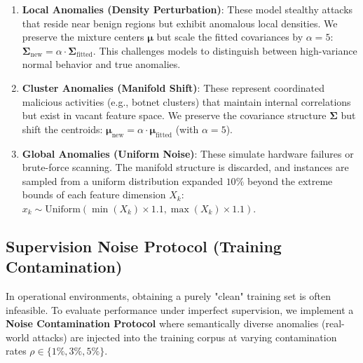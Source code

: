 \documentclass[final,twocolumn,10pt]{elsarticle}
\begin{document}
\begin{enumerate}
    \item \textbf{Local Anomalies (Density Perturbation)}: These model stealthy attacks that reside near benign regions but exhibit anomalous local densities. We preserve the mixture centers $\boldsymbol{\mu}$ but scale the fitted covariances by $\alpha = 5$: $\boldsymbol{\Sigma}_{\text{new}} = \alpha \cdot \boldsymbol{\Sigma}_{\text{fitted}}$. This challenges models to distinguish between high-variance normal behavior and true anomalies.
    
    \item \textbf{Cluster Anomalies (Manifold Shift)}: These represent coordinated malicious activities (e.g., botnet clusters) that maintain internal correlations but exist in vacant feature space. We preserve the covariance structure $\boldsymbol{\Sigma}$ but shift the centroids: $\boldsymbol{\mu}_{\text{new}} = \alpha \cdot \boldsymbol{\mu}_{\text{fitted}}$ (with $\alpha = 5$).
    
    \item \textbf{Global Anomalies (Uniform Noise)}: These simulate hardware failures or brute-force scanning. The manifold structure is discarded, and instances are sampled from a uniform distribution expanded $10\%$ beyond the extreme bounds of each feature dimension $X_k$:
    $x_k \sim \text{Uniform}(\min(X_k) \times 1.1, \max(X_k) \times 1.1)$.
\end{enumerate}

\subsection{Supervision Noise Protocol (Training Contamination)}
\label{ap:noise_contamination}

In operational environments, obtaining a purely "clean" training set is often infeasible. To evaluate performance under imperfect supervision, we implement a \textbf{Noise Contamination Protocol} where semantically diverse anomalies (real-world attacks) are injected into the training corpus at varying contamination rates $\rho \in \{1\%, 3\%, 5\%\}$.
\end{document}
